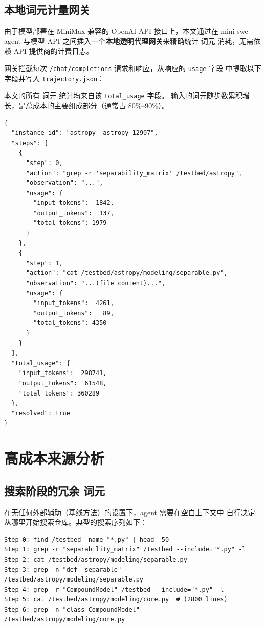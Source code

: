 \subsection{本地词元计量网关}
\label{subsec:词元-gateway}

由于模型部署在 MiniMax 兼容的 OpenAI API 接口上，本文通过在
mini-swe-agent 与模型 API 之间插入一个\textbf{本地透明代理网关}来精确统计
词元 消耗，无需依赖 API 提供商的计费日志。

网关拦截每次 \texttt{/chat/completions} 请求和响应，从响应的 \texttt{usage} 字段
中提取以下字段并写入 \texttt{trajectory.json}：

本文的所有 词元 统计均来自该 \texttt{total\_usage} 字段。
输入的词元随步数累积增长，是总成本的主要组成部分（通常占 80\%--90\%）。

\begin{lstlisting}[style=promptstyle, caption={trajectory.json 中的成本字段示例}, label={lst:trajectory-cost}]
{
  "instance_id": "astropy__astropy-12907",
  "steps": [
    {
      "step": 0,
      "action": "grep -r 'separability_matrix' /testbed/astropy",
      "observation": "...",
      "usage": {
        "input_tokens":  1842,
        "output_tokens":  137,
        "total_tokens": 1979
      }
    },
    {
      "step": 1,
      "action": "cat /testbed/astropy/modeling/separable.py",
      "observation": "...(file content)...",
      "usage": {
        "input_tokens":  4261,
        "output_tokens":   89,
        "total_tokens": 4350
      }
    }
  ],
  "total_usage": {
    "input_tokens":  298741,
    "output_tokens":  61548,
    "total_tokens": 360289
  },
  "resolved": true
}
\end{lstlisting}




\section{高成本来源分析}
\label{sec:cost-sources}

\subsection{搜索阶段的冗余 词元}
\label{subsec:search-cost}

在无任何外部辅助（基线方法）的设置下，agent 需要在空白上下文中
自行决定从哪里开始搜索仓库。典型的搜索序列如下：

\begin{lstlisting}[style=promptstyle, caption={典型 baseline 搜索序列（节选）}, label={lst:search-sequence}]
Step 0: find /testbed -name "*.py" | head -50
Step 1: grep -r "separability_matrix" /testbed --include="*.py" -l
Step 2: cat /testbed/astropy/modeling/separable.py
Step 3: grep -n "def _separable" /testbed/astropy/modeling/separable.py
Step 4: grep -r "CompoundModel" /testbed --include="*.py" -l
Step 5: cat /testbed/astropy/modeling/core.py  # (2800 lines)
Step 6: grep -n "class CompoundModel" /testbed/astropy/modeling/core.py
\end{lstlisting}

